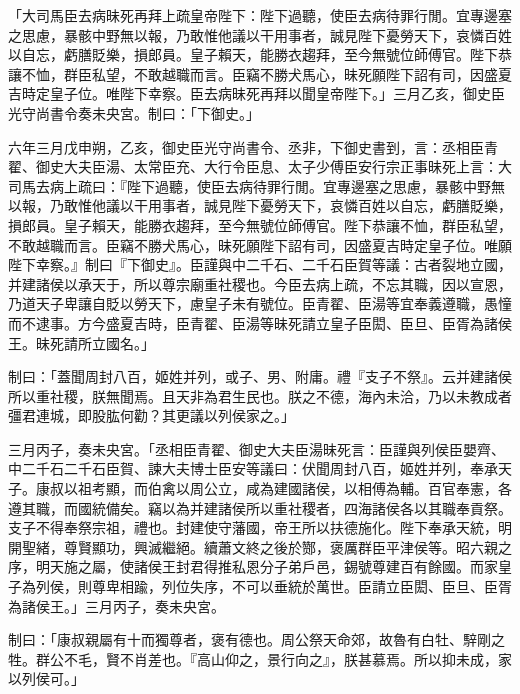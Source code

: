 
\begin{pinyinscope}
「大司馬臣去病昧死再拜上疏皇帝陛下：陛下過聽，使臣去病待罪行閒。宜專邊塞之思慮，暴骸中野無以報，乃敢惟他議以干用事者，誠見陛下憂勞天下，哀憐百姓以自忘，虧膳貶樂，損郎員。皇子賴天，能勝衣趨拜，至今無號位師傅官。陛下恭讓不恤，群臣私望，不敢越職而言。臣竊不勝犬馬心，昧死願陛下詔有司，因盛夏吉時定皇子位。唯陛下幸察。臣去病昧死再拜以聞皇帝陛下。」三月乙亥，御史臣光守尚書令奏未央宮。制曰：「下御史。」

六年三月戊申朔，乙亥，御史臣光守尚書令、丞非，下御史書到，言：丞相臣青翟、御史大夫臣湯、太常臣充、大行令臣息、太子少傅臣安行宗正事昧死上言：大司馬去病上疏曰：『陛下過聽，使臣去病待罪行閒。宜專邊塞之思慮，暴骸中野無以報，乃敢惟他議以干用事者，誠見陛下憂勞天下，哀憐百姓以自忘，虧膳貶樂，損郎員。皇子賴天，能勝衣趨拜，至今無號位師傅官。陛下恭讓不恤，群臣私望，不敢越職而言。臣竊不勝犬馬心，昧死願陛下詔有司，因盛夏吉時定皇子位。唯願陛下幸察。』制曰『下御史』。臣謹與中二千石、二千石臣賀等議：古者裂地立國，并建諸侯以承天于，所以尊宗廟重社稷也。今臣去病上疏，不忘其職，因以宣恩，乃道天子卑讓自貶以勞天下，慮皇子未有號位。臣青翟、臣湯等宜奉義遵職，愚憧而不逮事。方今盛夏吉時，臣青翟、臣湯等昧死請立皇子臣閎、臣旦、臣胥為諸侯王。昧死請所立國名。」

制曰：「蓋聞周封八百，姬姓并列，或子、男、附庸。禮『支子不祭』。云并建諸侯所以重社稷，朕無聞焉。且天非為君生民也。朕之不德，海內未洽，乃以未教成者彊君連城，即股肱何勸？其更議以列侯家之。」

三月丙子，奏未央宮。「丞相臣青翟、御史大夫臣湯昧死言：臣謹與列侯臣嬰齊、中二千石二千石臣賀、諫大夫博士臣安等議曰：伏聞周封八百，姬姓并列，奉承天子。康叔以祖考顯，而伯禽以周公立，咸為建國諸侯，以相傅為輔。百官奉憲，各遵其職，而國統備矣。竊以為并建諸侯所以重社稷者，四海諸侯各以其職奉貢祭。支子不得奉祭宗祖，禮也。封建使守藩國，帝王所以扶德施化。陛下奉承天統，明開聖緒，尊賢顯功，興滅繼絕。續蕭文終之後於酂，褒厲群臣平津侯等。昭六親之序，明天施之屬，使諸侯王封君得推私恩分子弟戶邑，錫號尊建百有餘國。而家皇子為列侯，則尊卑相踰，列位失序，不可以垂統於萬世。臣請立臣閎、臣旦、臣胥為諸侯王。」三月丙子，奏未央宮。

制曰：「康叔親屬有十而獨尊者，褒有德也。周公祭天命郊，故魯有白牡、騂剛之牲。群公不毛，賢不肖差也。『高山仰之，景行向之』，朕甚慕焉。所以抑未成，家以列侯可。」


\end{pinyinscope}
